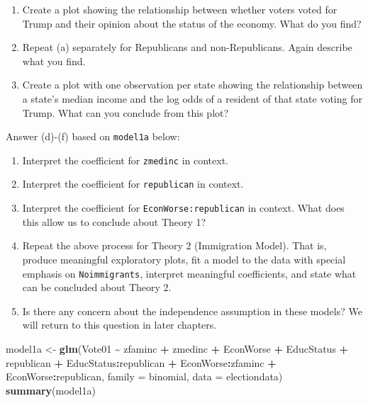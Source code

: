 \documentclass[
]{krantz}
\newenvironment{Shaded}{\begin{snugshade}}{\end{snugshade}}
\newcommand{\AttributeTok}[1]{\textcolor[rgb]{0.27,0.27,0.27}{#1}}
\newcommand{\FunctionTok}[1]{\textcolor[rgb]{0.27,0.27,0.27}{\textbf{#1}}}
\newcommand{\NormalTok}[1]{#1}
\newcommand{\OtherTok}[1]{\textcolor[rgb]{0.37,0.37,0.37}{#1}}
\newcommand{\SpecialCharTok}[1]{\textcolor[rgb]{0.43,0.43,0.43}{\textbf{#1}}}
\providecommand{\tightlist}{%
  \setlength{\itemsep}{0pt}\setlength{\parskip}{0pt}}
\begin{document}
\begin{enumerate}
  \begin{enumerate}
  \def\labelenumii{\alph{enumii}.}
  \tightlist
  \item
    Create a plot showing the relationship between whether voters voted for Trump and their opinion about the status of the economy. What do you find?
  \item
    Repeat (a) separately for Republicans and non-Republicans. Again describe what you find.
  \item
    Create a plot with one observation per state showing the relationship between a state's median income and the log odds of a resident of that state voting for Trump. What can you conclude from this plot?
  \end{enumerate}

  Answer (d)-(f) based on \texttt{model1a} below:

  \begin{enumerate}
  \def\labelenumii{\alph{enumii}.}
  \setcounter{enumii}{3}
  \tightlist
  \item
    Interpret the coefficient for \texttt{zmedinc} in context.
  \item
    Interpret the coefficient for \texttt{republican} in context.
  \item
    Interpret the coefficient for \texttt{EconWorse:republican} in context. What does this allow us to conclude about Theory 1?\\
  \item
    Repeat the above process for Theory 2 (Immigration Model). That is, produce meaningful exploratory plots, fit a model to the data with special emphasis on \texttt{Noimmigrants}, interpret meaningful coefficients, and state what can be concluded about Theory 2.
  \item
    Is there any concern about the independence assumption in these models? We will return to this question in later chapters.
  \end{enumerate}
\end{enumerate}

\begin{Shaded}
\begin{Highlighting}[]
\NormalTok{model1a }\OtherTok{\textless{}{-}} \FunctionTok{glm}\NormalTok{(Vote01 }\SpecialCharTok{\textasciitilde{}}\NormalTok{ zfaminc }\SpecialCharTok{+}\NormalTok{ zmedinc }\SpecialCharTok{+}\NormalTok{ EconWorse }\SpecialCharTok{+}
\NormalTok{    EducStatus }\SpecialCharTok{+}\NormalTok{ republican }\SpecialCharTok{+}\NormalTok{ EducStatus}\SpecialCharTok{:}\NormalTok{republican }\SpecialCharTok{+}
\NormalTok{    EconWorse}\SpecialCharTok{:}\NormalTok{zfaminc }\SpecialCharTok{+}\NormalTok{ EconWorse}\SpecialCharTok{:}\NormalTok{republican, }
    \AttributeTok{family =}\NormalTok{ binomial, }\AttributeTok{data =}\NormalTok{ electiondata)}
\FunctionTok{summary}\NormalTok{(model1a)}
\end{Highlighting}
\end{Shaded}
\end{document}
